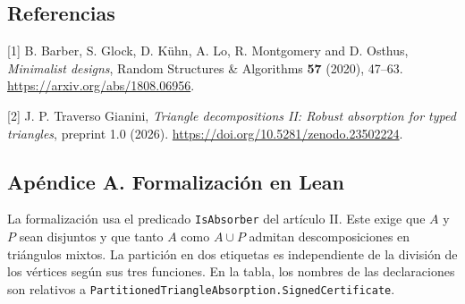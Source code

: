 \documentclass[spanish,11pt,a4paper]{article}
\begin{document}
\subsection{Referencias}\label{referencias}

{[}1{]} B. Barber, S. Glock, D. Kühn, A. Lo, R. Montgomery and D. Osthus, \emph{Minimalist designs}, Random Structures \& Algorithms \textbf{57} (2020), 47--63. \url{https://arxiv.org/abs/1808.06956}.

{[}2{]} J. P. Traverso Gianini, \emph{Triangle decompositions II: Robust absorption for typed triangles}, preprint 1.0 (2026). \url{https://doi.org/10.5281/zenodo.23502224}.

\subsection{Apéndice A. Formalización en Lean}\label{apuxe9ndice-a.-formalizaciuxf3n-en-lean}

La formalización usa el predicado \texttt{IsAbsorber} del artículo II. Este exige que \(A\) y \(P\) sean disjuntos y que tanto \(A\) como \(A\cup P\) admitan descomposiciones en triángulos mixtos. La partición en dos etiquetas es independiente de la división de los vértices según sus tres funciones. En la tabla, los nombres de las declaraciones son relativos a \texttt{PartitionedTriangleAbsorption.SignedCertificate}.
\end{document}
